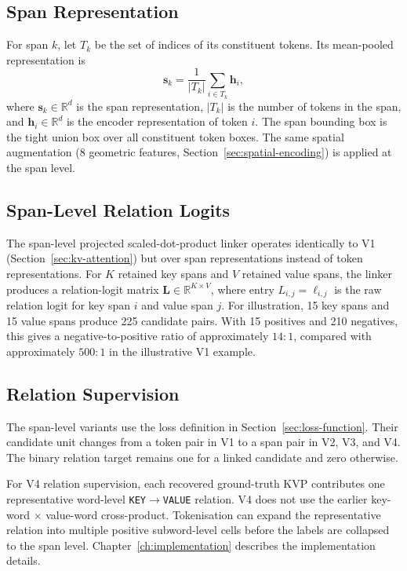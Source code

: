 \subsection{Span Representation}
\label{sec:span-representation}

For span $k$, let $T_k$ be the set of indices of its constituent tokens. Its
mean-pooled representation is
\[
  \mathbf{s}_k
  =\frac{1}{|T_k|}
   \sum_{i\in T_k}\mathbf{h}_i,
\]
where $\mathbf{s}_k\in\mathbb{R}^{d}$ is the span representation,
$|T_k|$ is the number of tokens in the span, and
$\mathbf{h}_i\in\mathbb{R}^{d}$ is the encoder representation of token $i$.
The span bounding box is the tight union box over all constituent token boxes.
The same spatial
augmentation (8 geometric features, Section~\ref{sec:spatial-encoding}) is
applied at the span level.

\subsection{Span-Level Relation Logits}
\label{sec:span-scoring}

The span-level projected scaled-dot-product linker operates identically to V1
(Section~\ref{sec:kv-attention}) but over span representations instead of
token representations. For $K$ retained key spans and $V$ retained value
spans, the linker produces a relation-logit matrix
$\mathbf{L}\in\mathbb{R}^{K\times V}$, where entry
$L_{i,j}=\ell_{i,j}$ is the raw relation logit for key span $i$ and value span
$j$. For illustration, 15 key spans and 15
value spans produce 225 candidate pairs. With 15 positives and 210 negatives,
this gives a negative-to-positive ratio of approximately \textbf{$14{:}1$},
compared with approximately $500{:}1$ in the illustrative V1 example.

\subsection{Relation Supervision}
\label{sec:v2-training}

The span-level variants use the loss definition in
Section~\ref{sec:loss-function}. Their candidate unit changes from a token
pair in V1 to a span pair in V2, V3, and V4. The binary relation target remains
one for a linked candidate and zero otherwise.

For V4 relation supervision, each recovered ground-truth KVP contributes one
representative word-level \texttt{KEY}$\rightarrow$\texttt{VALUE} relation.
V4 does not use the earlier key-word $\times$ value-word cross-product.
Tokenisation can expand the representative relation into multiple positive
subword-level cells before the labels are collapsed to the span level.
Chapter~\ref{ch:implementation} describes the implementation details.

